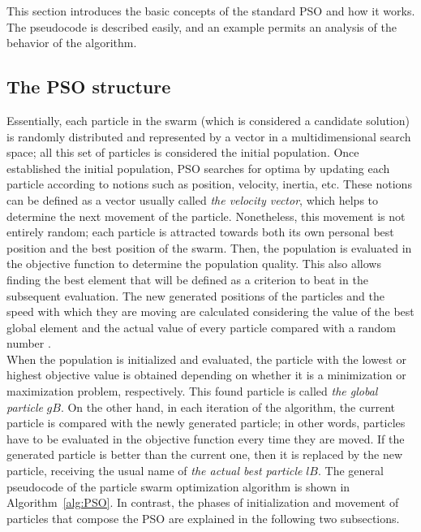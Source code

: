This section introduces the basic concepts of the standard PSO and how it works. The pseudocode is described easily, and an example permits an analysis of the behavior of the algorithm.

\subsection{The PSO structure}

Essentially, each particle in the swarm (which is considered a candidate solution) is randomly distributed and represented by a vector in a multidimensional search space; all this set of particles is considered the initial population. Once established the initial population, PSO searches for optima by updating each particle according to notions such as position, velocity, inertia, etc. These notions can be defined as a vector usually called \textit{the velocity vector}, which helps to determine the next movement of the particle. Nonetheless, this movement is not entirely random; each particle is attracted towards both its own personal best position and the best position of the swarm. Then, the population is evaluated in the objective function to determine the population quality. This also allows finding the best element that will be defined as a criterion to beat in the subsequent evaluation. The new generated positions of the particles and the speed with which they are moving are calculated considering the value of the best global element and the actual value of every particle compared with a random number \cite{erick2021matlab}.\\

When the population is initialized and evaluated, the particle with the lowest or highest objective value is obtained depending on whether it is a minimization or maximization problem, respectively. This found particle is called \textit{the global particle} $gB$. On the other hand, in each iteration of the algorithm, the current particle is compared with the newly generated particle; in other words, particles have to be evaluated in the objective function every time they are moved. If the generated particle is better than the current one, then it is replaced by the new particle, receiving the usual name of \textit{the actual best particle} $lB$. The general pseudocode of the particle swarm optimization algorithm is shown in Algorithm~\ref{alg:PSO}. In contrast, the phases of initialization and movement of particles that compose the PSO are explained in the following two subsections.\\

